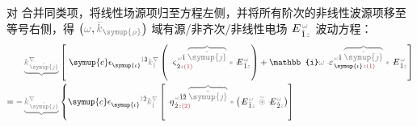 对  合并同类项，将线性场源项归至方程左侧，并将所有阶次的非线性波源项移至等号右侧，得 $\left( \mathcolor{gray}{\omega}, \mathcolor{gray}{\bar{k}_{\symup{\rho}}} \right)$ 域有源/非齐次/非线性电场 $\Xint{\mathcolor{gray}{-}}{295}{E}^{\;\!\mathcolor{gray}{\omega}}_{\;\! \hat{1} \mathcolor{gray}{z}}$ 波动方程：
\begin{subequations}
\begin{align}
	&\mathcolor{gray}{\underbrace{k^\nabla_{\;\! \check{\symup{\jmath}}}}} \left[~ {\symup{c}} \epsilon^{\hphantom{\symup{\iota}}\mathcolor{gray}{\dot{1}}\dot{2}}_{\symup{\iota}} \mathcolor{gray}{k^\nabla_{\dot{1}}} \left( \Xint{\begin{smallmatrix} ~ \\ {}^{}_{\mathcolor{gray}{-}} \\ ~ \end{smallmatrix}}{13}{\varsigma}^{\;\! \mathcolor{gray}{\omega} \hat{1} \;\! \mathcolor{gray}{\overbrace{\check{\symup{\jmath}}}}}_{\;\! \dot{2} \mathcolor{gray}{z} \textcolor{Maroon}{(1)}} \mathcolor{gray}{*} \Xint{\mathcolor{gray}{-}}{295}{E}^{\;\!\mathcolor{gray}{\omega}}_{\;\! \hat{1} \mathcolor{gray}{z}} \right) + \mathbb{i} \mathcolor{gray}{\omega} \Xint{\begin{smallmatrix} ~ \\ {}^{}_{\mathcolor{gray}{-}} \\ ~ \end{smallmatrix}}{16}{\varepsilon}^{\;\! \mathcolor{gray}{\omega} \hat{1} \;\! \mathcolor{gray}{\overbrace{\check{\symup{\jmath}}}}}_{\;\! \symup{\iota} \mathcolor{gray}{z} \textcolor{Maroon}{(1)}} \mathcolor{gray}{*} \Xint{\mathcolor{gray}{-}}{295}{E}^{\;\!\mathcolor{gray}{\omega}}_{\;\! \hat{1} \mathcolor{gray}{z}} \right]  \label{eq:nonlinear-wave_wkrho} \\ = - &\mathcolor{gray}{\underbrace{k^\nabla_{\;\! \check{\symup{\jmath}}}}} \left\{ {\symup{c}} \epsilon^{\hphantom{\symup{\iota}}\mathcolor{gray}{\dot{1}}\dot{2}}_{\symup{\iota}} \mathcolor{gray}{k^\nabla_{\dot{1}}} \left[ \Xint{\begin{smallmatrix} ~ \\ {}^{}_{\mathcolor{gray}{-}} \\ ~ \end{smallmatrix}}{17}{\eta}^{\;\! \mathcolor{gray}{\omega} \hat{1} \hat{2} \;\! \mathcolor{gray}{\overbrace{\check{\symup{\jmath}}}}}_{\;\! \dot{2} \mathcolor{gray}{z} \textcolor{Maroon}{(2)}} \mathcolor{gray}{*} \left( \Xint{\mathcolor{gray}{-}}{295}{E}^{\;\!\mathcolor{gray}{\omega}}_{\;\! \hat{1} \mathcolor{gray}{z}} ~\mathcolor{gray}{\widetilde \circledast}~ \Xint{\mathcolor{gray}{-}}{295}{E}^{\;\!\mathcolor{gray}{\omega}}_{\;\! \hat{2} \mathcolor{gray}{z}} \right) \right] \right. \\ 

\end{align}
\end{subequations}
